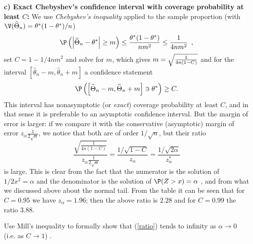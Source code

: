 \textbf{c) Exact Chebyshev's confidence interval with coverage probability at least $C$: } We use \textit{Chebyshev's inequality} applied to the sample
proportion (with $\V(\widehat{\Theta}_{n})=\theta^*(1-\theta^*)/n$) 
\begin{equation*}
\P \left( \left\vert \widehat{\Theta}_{n}-\theta^*\right\vert \geq m\right) \leq \frac{%
\theta^*(1-\theta^*)}{nm^{2}}\leq \frac{1}{4nm^{2}}\enspace ,
\end{equation*}%
set $C=1-1/4nm^{2}$ and solve for $m$, which gives $m=\sqrt{\frac{1}{%
4n(1-C)}}$ and for the interval $\left[ \widehat{\theta}_{n}-m,\widehat{\theta}_{n}+m\right] $
a confidence statement 
\begin{equation*}
\P \left( \left[ \widehat{\Theta}_{n}-m,\widehat{\Theta}_{n}+m\right] \ni \theta^* \right) \geq C.
\end{equation*}%
This interval has nonasymptotic (or \textit{exact}) coverage probability at
least $C$, and in that sense it is preferable to an asymptotic confidence
interval. But the margin of error is larger: if we compare it with the
conservative (asymptotic) margin of error $z_{\alpha}\frac{1}{2%
\sqrt{n}}$, we notice that both are of order $1/\sqrt{n}$, but their ratio 
\begin{equation}
\frac{\sqrt{\frac{1}{4n(1-C)}}}{z_{\alpha}\frac{1}{2\sqrt{n}}}=%
\frac{1/\sqrt{1-C}}{z_{\alpha}}=\frac{1/\sqrt{2\alpha }}{z_{\alpha
}^{\ast }}  \label{ratio}
\end{equation}%
is large. This is clear from the fact that the numerator is the solution of $%
1/2x^{2}=\alpha $ and the denominator is the solution of $\P (Z>x)=\alpha $%
, and from what we discussed above about the normal tail. From the table it
can be seen that for $C=0.95$ we have $z_{\alpha}=1.96$; then the
above ratio is $2.28$ and for $C=0.99$ the ratio $3.88.$\bigskip

\begin{Exercise}
Use Mill's inequality to formally show that (\ref{ratio})
tends to infinity as $\alpha \rightarrow 0$ (i.e. as $C\rightarrow 1$) .
\end{Exercise}

